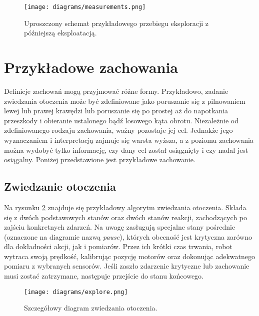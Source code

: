 \begin{figure}[!ht]
    \centering
        \texttt{[image: diagrams/measurements.png]}
    \caption{Uproszczony schemat przykładowego przebiegu eksploracji z późniejszą eksploatacją.\label{fig:measurements}}
\end{figure}

\section{Przykładowe zachowania}

Definicje zachowań mogą przyjmować różne formy. Przykładowo, zadanie zwiedzania otoczenia może być zdefiniowane jako poruszanie się z pilnowaniem lewej lub prawej krawędzi lub poruszanie się po prostej aż do napotkania przeszkody i obieranie ustalonego bądź losowego kąta obrotu. Niezależnie od zdefiniowanego rodzaju zachowania, ważny pozostaje jej cel. Jednakże jego wyznaczaniem i interpretacją zajmuje się warsta wyższa, a z poziomu zachowania można wydobyć tylko informację, czy dany cel został osiągnięty i czy nadal jest osiągalny. Poniżej przedstawione jest przykładowe zachowanie.

\subsection{Zwiedzanie otoczenia}

Na rysunku \ref{fig:explore} znajduje się przykładowy algorytm zwiedzania otoczenia. Składa się z dwóch podstawowych stanów oraz dwóch stanów reakcji, zachodzących po zajściu konkretnych zdarzeń. Na uwagę zasługują specjalne stany pośrednie (oznaczone na diagramie nazwą \textit{pause}), których obecność jest krytyczna zarówno dla dokładności akcji, jak i pomiarów. Przez ich krótki czas trwania, robot wytraca swoją prędkość, kalibrując pozycję motorów oraz dokonując adekwatnego pomiaru z wybranych sensorów. Jeśli zaszło zdarzenie krytyczne lub zachowanie musi zostać zatrzymane, następuje przejście do stanu końcowego.

\begin{figure}[!ht]
    \centering
        \texttt{[image: diagrams/explore.png]}
    \caption{Szczegółowy diagram zwiedzania otoczenia.\label{fig:explore}}
\end{figure}


